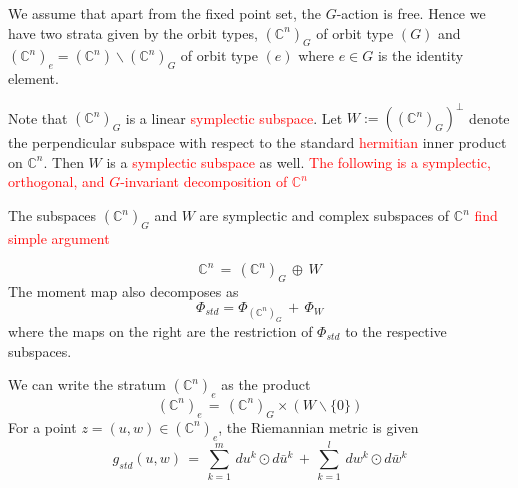 \documentclass[a4paper,12pt]{article}
\newcommand{\C}{\mathbb{C}}
\newcommand{\tgt}[2]{T_{#1} #2}
\newcommand{\red}[1]{\textcolor{red}{#1}}
\begin{document}
	We assume that apart from the fixed point set, the $G$-action is free. Hence we have two strata given by the orbit types, $(\C^n)_G$ of orbit type $(G)$ and $(\C^n)_e=(\C^n)\backslash (\C^n)_{G}$ of orbit type $(e)$ where $e\in G$ is the identity element. 
	
	Note that $(\C^n)_G$ is a linear \red{symplectic subspace}. Let $W:= ((\C^n)_G)^\perp$ denote the perpendicular subspace with respect to the standard \red{hermitian} inner product on $\C^n$. Then $W$ is a \red{symplectic subspace} as well. \red{The following is a symplectic, orthogonal, and $G$-invariant decomposition of $\C^n$}
		\begin{lemma}
		The subspaces $(\C^n)_G$ and $W$ are symplectic and complex subspaces of $\C^n$ \red{find simple argument}
	\end{lemma}

	\begin{equation}
		\C^n \,=\, (\C^n)_G \, \oplus \, W
	\end{equation}
	The moment map also decomposes as
	\begin{equation}
		 \Phi_{std} = \Phi_{(\C^n)_G} \,+\, \Phi_W	
	\end{equation}
	where the maps on the right are the restriction of $\Phi_{std}$ to the respective subspaces.

%		
	We can write the stratum $(\C^n)_e$ as the product
	\begin{equation}
		(\C^n)_e \,=\, (\C^n)_G \times (W \backslash\{0\})
	\end{equation}
	For a point $z=(u,w)\in (\C^n)_e$, the Riemannian metric is given
	\begin{equation}
		g_{std} (u,w) \,=\, \sum_{k=1}^m \, du^k \odot d\bar{u}^k \,+\, \sum_{k=1}^l \, dw^k \odot d\bar{w}^k
	\end{equation} 
	
\end{document}

